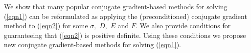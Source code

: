 \documentclass{report}
\begin{document}
We show that many popular conjugate gradient-based methods for solving
(\ref{eqn1}) can be reformulated as applying the (preconditioned)
conjugate gradient method to (\ref{eqn2}) for some $\sigma,$ $D,$ $E$ and
$F.$ We also provide conditions for guaranteeing that (\ref{eqn2}) is
positive definite. Using these conditions we propose new conjugate
gradient-based methods for solving (\ref{eqn1}).
\end{document}
